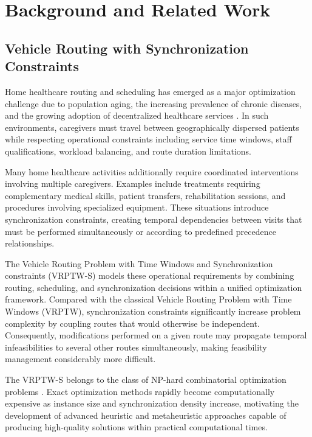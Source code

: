 \section{Background and Related Work}
\label{sec:background}

\subsection{Vehicle Routing with Synchronization Constraints}
Home healthcare routing and scheduling has emerged as a major optimization challenge due to population aging, the increasing prevalence of chronic diseases, and the growing adoption of decentralized healthcare services \citep{masmoudi2024home}. In such environments, caregivers must travel between geographically dispersed patients while respecting operational constraints including service time windows, staff qualifications, workload balancing, and route duration limitations.

Many home healthcare activities additionally require coordinated interventions involving multiple caregivers. Examples include treatments requiring complementary medical skills, patient transfers, rehabilitation sessions, and procedures involving specialized equipment. These situations introduce synchronization constraints, creating temporal dependencies between visits that must be performed simultaneously or according to predefined precedence relationships.

The Vehicle Routing Problem with Time Windows and Synchronization constraints (VRPTW-S) models these operational requirements by combining routing, scheduling, and synchronization decisions within a unified optimization framework. Compared with the classical Vehicle Routing Problem with Time Windows (VRPTW), synchronization constraints significantly increase problem complexity by coupling routes that would otherwise be independent. Consequently, modifications performed on a given route may propagate temporal infeasibilities to several other routes simultaneously, making feasibility management considerably more difficult.

The VRPTW-S belongs to the class of NP-hard combinatorial optimization problems \citep{lenstra1981complexity}. Exact optimization methods rapidly become computationally expensive as instance size and synchronization density increase, motivating the development of advanced heuristic and metaheuristic approaches capable of producing high-quality solutions within practical computational times.

